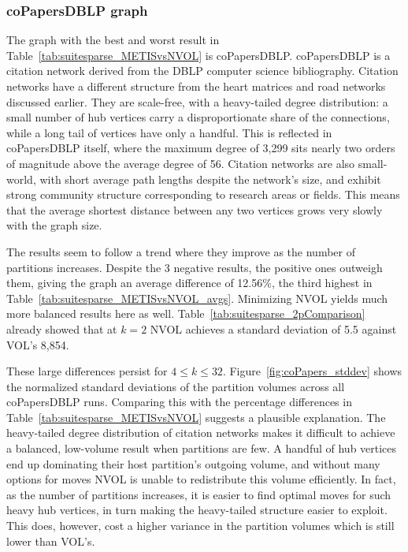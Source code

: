\subsubsection{coPapersDBLP graph}
The graph with the best and worst result in Table~\ref{tab:suitesparse_METISvsNVOL} is coPapersDBLP. coPapersDBLP is a citation network derived from the DBLP computer science bibliography. Citation networks have a different structure from the heart matrices and road networks discussed earlier. They are scale-free, with a heavy-tailed degree distribution: a small number of hub vertices carry a disproportionate share of the connections, while a long tail of vertices have only a handful. This is reflected in coPapersDBLP itself, where the maximum degree of 3,299 sits nearly two orders of magnitude above the average degree of 56. Citation networks are also small-world, with short average path lengths despite the network's size, and exhibit strong community structure corresponding to research areas or fields. This means that the average shortest distance between any two vertices grows very slowly with the graph size. 

The results seem to follow a trend where they improve as the number of partitions increases. Despite the 3 negative results, the positive ones outweigh them, giving the graph an average difference of 12.56\%, the third highest in Table~\ref{tab:suitesparse_METISvsNVOL_avgs}. Minimizing NVOL yields much more balanced results here as well. Table~\ref{tab:suitesparse_2pComparison} already showed that at $k=2$ NVOL achieves a standard deviation of 5.5 against VOL's 8,854. 

These large differences persist for $4\leq k \leq 32$. Figure~\ref{fig:coPapers_stddev} shows the normalized standard deviations of the partition volumes across all coPapersDBLP runs. Comparing this with the percentage differences in Table~\ref{tab:suitesparse_METISvsNVOL} suggests a plausible explanation. The heavy-tailed degree distribution of citation networks makes it difficult to achieve a balanced, low-volume result when partitions are few. A handful of hub vertices end up dominating their host partition's outgoing volume, and without many options for moves NVOL is unable to redistribute this volume efficiently. In fact, as the number of partitions increases, it is easier to find optimal moves for such heavy hub vertices, in turn making the heavy-tailed structure easier to exploit. This does, however, cost a higher variance in the partition volumes which is still lower than VOL's.
 
